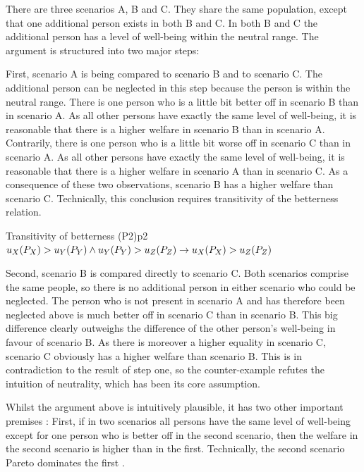 There are three scenarios A, B and C. They share the same population, except that one additional person exists in both B and C. In both B and C the additional person has a level of well-being within the neutral range. The argument is structured into two major steps:  

First, scenario A is being compared to scenario B and to scenario C. The additional person can be neglected in this step because the person is within the neutral range. There is one person who is a little bit better off in scenario B than in scenario A. As all other persons have exactly the same level of well-being, it is reasonable that there is a higher welfare in scenario B than in scenario A. Contrarily, there is one person who is a little bit worse off in scenario C than in scenario A. As all other persons have exactly the same level of well-being, it is reasonable that there is a higher welfare in scenario A than in scenario C. As a consequence of these two observations, scenario B has a higher welfare than scenario C. Technically, this conclusion requires transitivity of the betterness relation.  

\begin{Premise}{Transitivity of betterness (P2)}{p2}
$
  u_X(P_X) > u_Y(P_Y) \wedge u_Y(P_Y) > u_Z(P_Z) \\
  \rightarrow
  u_X(P_X) > u_Z(P_Z)
$
\end{Premise}

Second, scenario B is compared directly to scenario C. Both scenarios comprise the same people, so there is no additional person in either scenario who could be neglected. The person who is not present in scenario A and has therefore been neglected above is much better off in scenario C than in scenario B. This big difference clearly outweighs the difference of the other person’s well-being in favour of scenario B. As there is moreover a higher equality in scenario C, scenario C obviously has a higher welfare than scenario B. This is in contradiction to the result of step one, so the counter-example refutes the intuition of neutrality, which has been its core assumption.  

Whilst the argument above is intuitively plausible, it has two other important premises \cite[p.~177f]{broome_2012}: First, if in two scenarios all persons have the same level of well-being except for one person who is better off in the second scenario, then the welfare in the second scenario is higher than in the first. Technically, the second scenario Pareto dominates the first \cite{osborne_1997}. 

